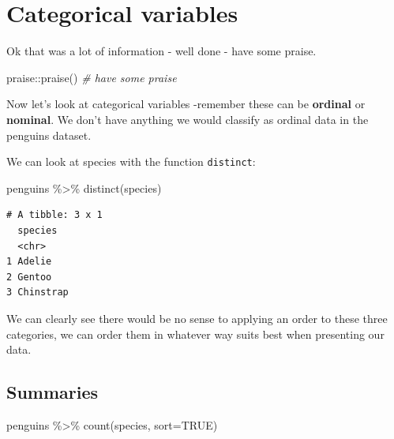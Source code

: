 \documentclass[
]{book}
\newenvironment{Shaded}{\begin{snugshade}}{\end{snugshade}}
\newcommand{\AttributeTok}[1]{\textcolor[rgb]{0.77,0.63,0.00}{#1}}
\newcommand{\CommentTok}[1]{\textcolor[rgb]{0.56,0.35,0.01}{\textit{#1}}}
\newcommand{\ConstantTok}[1]{\textcolor[rgb]{0.00,0.00,0.00}{#1}}
\newcommand{\FunctionTok}[1]{\textcolor[rgb]{0.00,0.00,0.00}{#1}}
\newcommand{\NormalTok}[1]{#1}
\newcommand{\SpecialCharTok}[1]{\textcolor[rgb]{0.00,0.00,0.00}{#1}}
\begin{document}
\hypertarget{categorical-variables}{%
\section{Categorical variables}\label{categorical-variables}}

Ok that was a lot of information - well done - have some praise.

\begin{Shaded}
\begin{Highlighting}[]
\NormalTok{praise}\SpecialCharTok{::}\FunctionTok{praise}\NormalTok{()}
\CommentTok{\# have some praise}
\end{Highlighting}
\end{Shaded}

Now let's look at categorical variables -remember these can be \textbf{ordinal} or \textbf{nominal}. We don't have anything we would classify as ordinal data in the penguins dataset.

We can look at species with the function \texttt{distinct}:

\begin{Shaded}
\begin{Highlighting}[]
\NormalTok{penguins }\SpecialCharTok{\%\textgreater{}\%} 
  \FunctionTok{distinct}\NormalTok{(species)}
\end{Highlighting}
\end{Shaded}

\begin{verbatim}
# A tibble: 3 x 1
  species  
  <chr>    
1 Adelie   
2 Gentoo   
3 Chinstrap
\end{verbatim}

We can clearly see there would be no sense to applying an order to these three categories, we can order them in whatever way suits best when presenting our data.

\hypertarget{summaries}{%
\subsection{Summaries}\label{summaries}}

\begin{Shaded}
\begin{Highlighting}[]
\NormalTok{penguins }\SpecialCharTok{\%\textgreater{}\%} 
  \FunctionTok{count}\NormalTok{(species, }\AttributeTok{sort=}\ConstantTok{TRUE}\NormalTok{)}
\end{Highlighting}
\end{Shaded}
\end{document}
